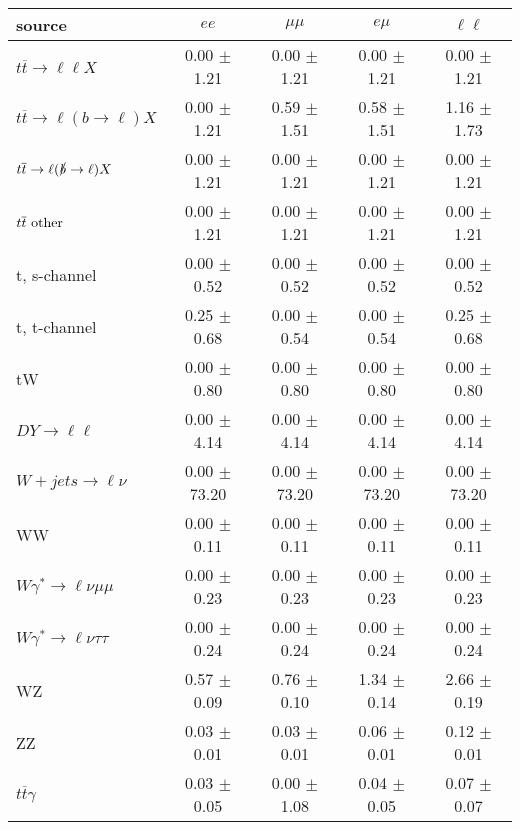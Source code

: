 \begin{tabular}{l|cccc} \hline\hline
source & $ee$ & $\mu\mu$ & $e\mu$ & $\ell\ell $ \\
\hline
$t\overline{t} \rightarrow \ell \ell X$ &  0.00 $\pm$  1.21 &  0.00 $\pm$  1.21 &  0.00 $\pm$  1.21 &  0.00 $\pm$  1.21 \\
$t\overline{t} \rightarrow \ell (b \rightarrow \ell) X$ &  0.00 $\pm$  1.21 &  0.59 $\pm$  1.51 &  0.58 $\pm$  1.51 &  1.16 $\pm$  1.73 \\
$t\overline{t} \rightarrow \ell (\slashed b \rightarrow \ell) X$ &  0.00 $\pm$  1.21 &  0.00 $\pm$  1.21 &  0.00 $\pm$  1.21 &  0.00 $\pm$  1.21 \\
        $t\overline{t}\ \rm{other}$ &  0.00 $\pm$  1.21 &  0.00 $\pm$  1.21 &  0.00 $\pm$  1.21 &  0.00 $\pm$  1.21 \\
\hline
                       t, s-channel &  0.00 $\pm$  0.52 &  0.00 $\pm$  0.52 &  0.00 $\pm$  0.52 &  0.00 $\pm$  0.52 \\
                       t, t-channel &  0.25 $\pm$  0.68 &  0.00 $\pm$  0.54 &  0.00 $\pm$  0.54 &  0.25 $\pm$  0.68 \\
                                 tW &  0.00 $\pm$  0.80 &  0.00 $\pm$  0.80 &  0.00 $\pm$  0.80 &  0.00 $\pm$  0.80 \\
\hline
         $DY \rightarrow \ell \ell$ &  0.00 $\pm$  4.14 &  0.00 $\pm$  4.14 &  0.00 $\pm$  4.14 &  0.00 $\pm$  4.14 \\
      $W+jets \rightarrow \ell \nu$ &  0.00 $\pm$ 73.20 &  0.00 $\pm$ 73.20 &  0.00 $\pm$ 73.20 &  0.00 $\pm$ 73.20 \\
                                 WW &  0.00 $\pm$  0.11 &  0.00 $\pm$  0.11 &  0.00 $\pm$  0.11 &  0.00 $\pm$  0.11 \\
\hline
$W\gamma^{*} \rightarrow \ell \nu \mu\mu$ &  0.00 $\pm$  0.23 &  0.00 $\pm$  0.23 &  0.00 $\pm$  0.23 &  0.00 $\pm$  0.23 \\
$W\gamma^{*} \rightarrow \ell \nu \tau\tau$ &  0.00 $\pm$  0.24 &  0.00 $\pm$  0.24 &  0.00 $\pm$  0.24 &  0.00 $\pm$  0.24 \\
                                 WZ &  0.57 $\pm$  0.09 &  0.76 $\pm$  0.10 &  1.34 $\pm$  0.14 &  2.66 $\pm$  0.19 \\
                                 ZZ &  0.03 $\pm$  0.01 &  0.03 $\pm$  0.01 &  0.06 $\pm$  0.01 &  0.12 $\pm$  0.01 \\
\hline
              $t\overline{t}\gamma$ &  0.03 $\pm$  0.05 &  0.00 $\pm$  1.08 &  0.04 $\pm$  0.05 &  0.07 $\pm$  0.07 \\

\end{tabular}
